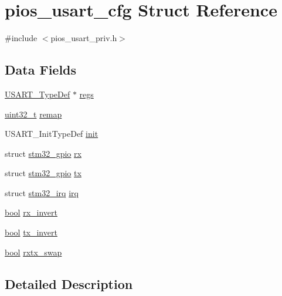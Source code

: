 \hypertarget{structpios__usart__cfg}{\section{pios\-\_\-usart\-\_\-cfg Struct Reference}
\label{structpios__usart__cfg}
}


{\ttfamily \#include $<$pios\-\_\-usart\-\_\-priv.\-h$>$}

\subsection*{Data Fields}
\begin{DoxyCompactItemize}
\item 
\hyperlink{struct_u_s_a_r_t___type_def}{U\-S\-A\-R\-T\-\_\-\-Type\-Def} $\ast$ \hyperlink{structpios__usart__cfg_a28b475a517c9d2fee0ab1a87d3c6ca67}{regs}
\item 
\hyperlink{stdint_8h_a435d1572bf3f880d55459d9805097f62}{uint32\-\_\-t} \hyperlink{structpios__usart__cfg_a811f7d8ba9be86fdade5aedee961ebb2}{remap}
\item 
U\-S\-A\-R\-T\-\_\-\-Init\-Type\-Def \hyperlink{structpios__usart__cfg_a20bd842c61ef010b8bfcf2cc42c19d1a}{init}
\item 
struct \hyperlink{structstm32__gpio}{stm32\-\_\-gpio} \hyperlink{structpios__usart__cfg_a8d393f43a5f748de6580907c5f7d0a48}{rx}
\item 
struct \hyperlink{structstm32__gpio}{stm32\-\_\-gpio} \hyperlink{structpios__usart__cfg_adc652d014f5c2fd4c1cc152df614ba64}{tx}
\item 
struct \hyperlink{structstm32__irq}{stm32\-\_\-irq} \hyperlink{structpios__usart__cfg_aa2e41bd55618914f579729a722e2133e}{irq}
\item 
\hyperlink{group___exported__types_gaf6a258d8f3ee5206d682d799316314b1}{bool} \hyperlink{structpios__usart__cfg_a89504d674cb5ee30a137ad3d0405c8dd}{rx\-\_\-invert}
\item 
\hyperlink{group___exported__types_gaf6a258d8f3ee5206d682d799316314b1}{bool} \hyperlink{structpios__usart__cfg_afc7c29e0ea546f0e5ed89b0063a51198}{tx\-\_\-invert}
\item 
\hyperlink{group___exported__types_gaf6a258d8f3ee5206d682d799316314b1}{bool} \hyperlink{structpios__usart__cfg_a19b707efa22b300cd9af50ded5e95b6d}{rxtx\-\_\-swap}
\end{DoxyCompactItemize}


\subsection{Detailed Description}


